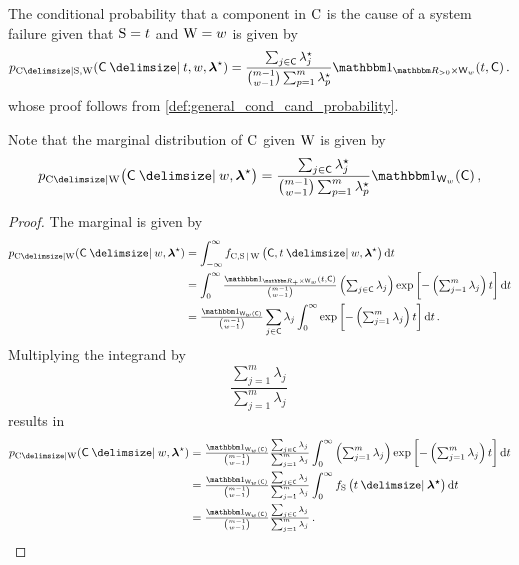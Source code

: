 \documentclass[
    11pt,
    extrafontsizes,
    article,
    oldfontcommands,
    final,
    oneside,
    openany,
    hidelinks]{memoir}
\begin{document}
The conditional probability that a component in $\mathrm{C}$ is the cause of a system failure given that $\mathrm{S} = t$ and $\mathrm{W} = w$ is given by
\begin{equation}
\label{eq:expo_cand_given_s}
    \pmf_{\rvcand \Given \sv, \RV{W}}(\cand \Given t, w, \tparam{\vec\lambda}) =
        \frac{ \sum_{j \in \cand} \tparam{\lambda}_j }
            { \binom{m-1}{w-1} \sum_{p=1}^{m} \tparam{\lambda}_p } \SetIndicator{\RealSet_{>0} \times \candsw{w}}(t,\cand)\,.
\end{equation}
whose proof follows from \cref{def:general_cond_cand_probability}.

Note that the marginal distribution of $\mathrm{C}$ given $\mathrm{W}$ is given by
\begin{equation}
\label{eq:expo_cand_given_s}
     \pmf_{\rvcand \Given \RV{W}}\!\left(\cand \Given w, \tparam{\vec\lambda}\right) =
        \frac{ \sum_{j \in \cand} \tparam{\lambda}_j }
            { \binom{m-1}{w-1} \sum_{p=1}^{m} \tparam{\lambda}_p } \SetIndicator{\candsw{w}}(\cand)\,,
\end{equation}
\begin{proof}
The marginal is given by
\begin{align}
     \pmf_{\rvcand \Given \RV{W}}(\cand \Given w, \tparam{\vec\lambda})
        &= \int_{-\infty}^{\infty} \jointpdf\left(\cand, t \Given w, \tparam{\vec\lambda}\right) \dif t\\
        &= \int_{0}^{\infty} \mathsmaller{\frac{\SetIndicator{\RealSet_{+} \times \candsw{w}}(t,\cand)}{\binom{m-1}{w-1}}
        	\left ( \sum_{j \in \cand} \lambda_j \right ) \exp \left [ - \left ( \sum_{j=1}^{m} \lambda_j \right ) t \right ] \dif t}\\
        &= \mathsmaller{\frac{ \SetIndicator{\candsw{w}(\cand)}}{\binom{m-1}{w-1}}} \sum_{j \in \cand} \lambda_j \int_{0}^{\infty} \mathsmaller{ \exp \left [ - \left ( \sum_{j=1}^{m} \lambda_j \right ) t \right ] \dif t}\,.
\end{align}
Multiplying the integrand by
\begin{equation}
    \frac{\sum_{j=1}^{m} \lambda_j}{\sum_{j=1}^{m} \lambda_j}\,
\end{equation}
results in
\begin{align}
     \pmf_{\rvcand \Given \RV{W}}(\cand \Given w, \tparam{\vec\lambda})
        &= \mathsmaller{\frac{ \SetIndicator{\candsw{w}(\cand)} }{\binom{m-1}{w-1}} \frac{\sum_{j \in \cand} \lambda_j}{\sum_{j=1}^{m} \lambda_j}} \int_{0}^{\infty} \mathsmaller{ \left ( \sum_{j=1}^{m} \lambda_j \right) \exp \left [ - \left ( \sum_{j=1}^{m} \lambda_j \right ) t \right ] \dif t}\\
        &= \mathsmaller{\frac{ \SetIndicator{\candsw{w}(\cand)} }{\binom{m-1}{w-1}} \frac{\sum_{j \in \cand} \lambda_j}{\sum_{j=1}^{m} \lambda_j}} \int_{0}^{\infty} \spdf\left(t \Given \vec{\tparam\lambda}\right) \dif t\\
        &= \mathsmaller{\frac{ \SetIndicator{\candsw{w}(\cand)}}{\binom{m-1}{w-1}} \frac{\sum_{j \in \cand} \lambda_j}{\sum_{j=1}^{m} \lambda_j}}\,.
\end{align}
\end{proof}
\end{document}
